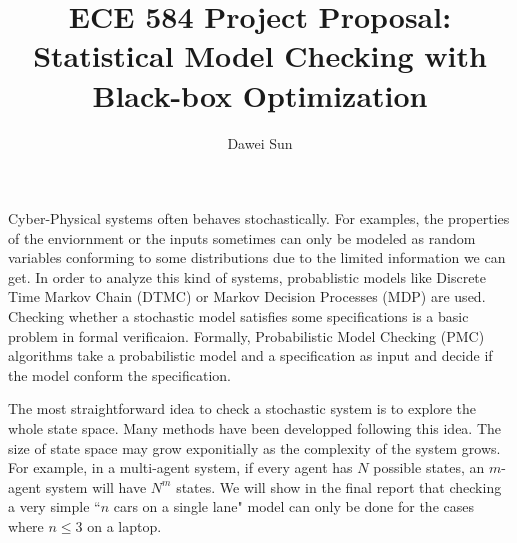 \documentclass[11pt]{article}
\begin{document}
\author{Dawei Sun}
\title{ECE 584 Project Proposal: Statistical Model Checking with Black-box Optimization}
\maketitle

\medskip

Cyber-Physical systems often behaves stochastically. For examples, the properties of the enviornment or the inputs sometimes can only be modeled as random variables conforming to some distributions due to the limited information we can get. In order to analyze this kind of systems, probablistic models like Discrete Time Markov Chain (DTMC) or Markov Decision Processes (MDP) are used. Checking whether a stochastic model satisfies some specifications is a basic problem in formal verificaion. Formally, Probabilistic Model Checking (PMC) algorithms take a probabilistic model and a specification as input and decide if the model conform the specification.

The most straightforward idea to check a stochastic system is to explore the whole state space. Many methods have been developped following this idea. The size of state space may grow exponitially as the complexity of the system grows. For example, in a multi-agent system, if every agent has $N$ possible states, an $m$-agent system will have $N^m$ states. We will show in the final report that checking a very simple ``$n$ cars on a single lane" model can only be done for the cases where $n \leq 3$ on a laptop.


\end{document}
